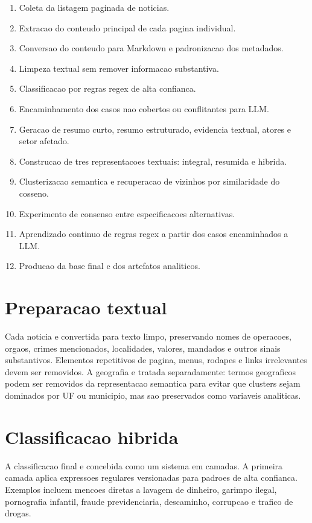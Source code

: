 \documentclass[12pt]{article}
\begin{document}
\begin{enumerate}
    \item Coleta da listagem paginada de noticias.
    \item Extracao do conteudo principal de cada pagina individual.
    \item Conversao do conteudo para Markdown e padronizacao dos metadados.
    \item Limpeza textual sem remover informacao substantiva.
    \item Classificacao por regras regex de alta confianca.
    \item Encaminhamento dos casos nao cobertos ou conflitantes para LLM.
    \item Geracao de resumo curto, resumo estruturado, evidencia textual, atores e setor afetado.
    \item Construcao de tres representacoes textuais: integral, resumida e hibrida.
    \item Clusterizacao semantica e recuperacao de vizinhos por similaridade do cosseno.
    \item Experimento de consenso entre especificacoes alternativas.
    \item Aprendizado continuo de regras regex a partir dos casos encaminhados a LLM.
    \item Producao da base final e dos artefatos analiticos.
\end{enumerate}

\section{Preparacao textual}

Cada noticia e convertida para texto limpo, preservando nomes de operacoes, orgaos, crimes mencionados, localidades, valores, mandados e outros sinais substantivos. Elementos repetitivos de pagina, menus, rodapes e links irrelevantes devem ser removidos. A geografia e tratada separadamente: termos geograficos podem ser removidos da representacao semantica para evitar que clusters sejam dominados por UF ou municipio, mas sao preservados como variaveis analiticas.

\section{Classificacao hibrida}

A classificacao final e concebida como um sistema em camadas. A primeira camada aplica expressoes regulares versionadas para padroes de alta confianca. Exemplos incluem mencoes diretas a lavagem de dinheiro, garimpo ilegal, pornografia infantil, fraude previdenciaria, descaminho, corrupcao e trafico de drogas.
\end{document}
